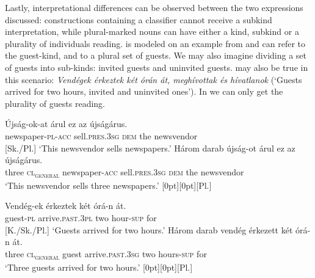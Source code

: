 \documentclass[output=paper]{langscibook}
\begin{document}
\noindent Lastly, interpretational differences can be observed between the two expressions discussed: constructions containing a classifier cannot receive a subkind interpretation, while plural-marked nouns can have either a kind, subkind or a plurality of individuals reading.   is modeled on an example from \citet{landman-rothstein-10} and can refer to the guest-kind, and to a plural set of guests. We may also imagine dividing a set of guests into sub-kinds:  invited guests and uninvited guests.  may also be true in this scenario: \textit{Vendégek érkeztek két órán át, meghívottak és hívatlanok} (`Guests arrived for two hours, invited and uninvited ones'). In  we can only get the plurality of guests reading. 

\ea \label{schv-nem:ex:30}
\ea \label{schv-nem:ex:30a}
\gll Újság-ok-at árul ez az újságárus.\\
newspaper-\textsc{pl}-\textsc{acc} sell.\textsc{pres}.\textsc{3sg} \textsc{dem} the  newsvendor\\ \hfill [Sk./Pl.]
\glt `This newsvendor sells newspapers.'
\ex \label{schv-nem:ex:30b}
\gll Három darab újság-ot árul ez az újságárus.\\
three \textsc{cl\textsubscript{general}} newspaper-\textsc{acc} sell.\textsc{pres}.\textsc{3sg} \textsc{dem} the  newsvendor\\
\glt `This newsvendor sells three newspapers.'   \hfill \raisebox{2.3\baselineskip}[0pt][0pt]{[Pl.]}
\z
\z


\ea \label{schv-nem:ex:31}
\ea \label{schv-nem:ex:31a}
\gll Vendég-ek érkeztek két órá-n át.\\
guest-\textsc{pl} arrive.\textsc{past}.\textsc{3pl} two hour-\textsc{sup} for\\ \hfill [K./Sk./Pl.]
\glt `Guests arrived for two hours.'  \hfill \citep[p.188, (14)]{schvarcz-rothstein-17} 
\ex \label{schv-nem:ex:31b}
\gll Három darab vendég érkezett két órá-n át.\\
three \textsc{cl\textsubscript{general}} guest  arrive.\textsc{past}.\textsc{3sg} two  hours-\textsc{sup} for\\
\glt `Three guests arrived for two hours.'   \hfill \raisebox{2.3\baselineskip}[0pt][0pt]{[Pl.]}
\z
\z
\end{document}
